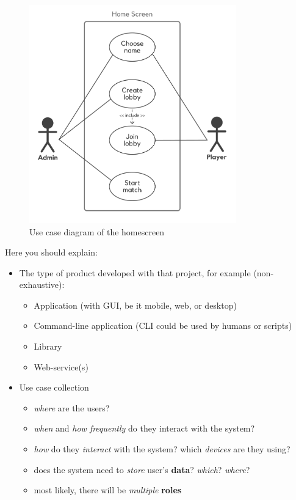 \documentclass{scrartcl}
\begin{document}
\begin{figure}
    \centering
    \includegraphics[width=0.8\textwidth]{figures/useCase1.png}
    \caption{Use case diagram of the homescreen} 
    \label{fig:universe}
\end{figure}

Here you should explain:

\begin{itemize}
  \item The type of product developed with that project, for example
  (non-exhaustive):

  \begin{itemize}
    \item Application (with GUI, be it mobile, web, or desktop)
    \item Command-line application (CLI could be used by humans or scripts)
    \item Library
    \item Web-service(s)
  \end{itemize}
  \item Use case collection

  \begin{itemize}
    \item \emph{where} are the users?
    \item \emph{when} and \emph{how frequently} do they interact with the
    system?
    \item \emph{how} do they \emph{interact} with the system? which
    \emph{devices} are they using?
    \item does the system need to \emph{store} user's \textbf{data}?
    \emph{which}? \emph{where}?
    \item most likely, there will be \emph{multiple} \textbf{roles}
  \end{itemize}
\end{itemize}
\end{document}
